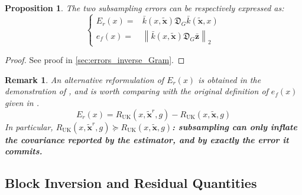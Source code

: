 \documentclass[preprint]{elsarticle}
\newtheorem{proposition}{Proposition}
\newtheorem{remark}{Remark}
\begin{document}
\begin{proposition}
    The two subsampling errors can be respectively expressed as:
    \begin{equation*}
        \left\{\begin{aligned}
        E_r(x)=&\bar{k}(x,\tilde{\mathbf{x}})\mathfrak{D}_G\bar{k}(\tilde{\mathbf{x}},x)\\
        e_f(x)=&\left\|\bar{k}(x,\tilde{\mathbf{x}})\mathfrak{D}_G\bar{\mathbf{z}}\right\|_2
        \end{aligned}\right.
    \end{equation*}\label{th:errors_inverse_Gram}
    \vspace{-\baselineskip}
\end{proposition}

\begin{proof}
    See proof in \cref{sec:errors_inverse_Gram}.
\end{proof}

\begin{remark}
    An alternative reformulation of $E_r(x)$ is obtained in the demonstration of , and is worth comparing with the original definition of $e_f(x)$ given in .
    \begin{equation*}
        E_r(x)=R_{\mathrm{UK}}(x,\tilde{\mathbf{x}}^r,g)-R_{\mathrm{UK}}(x,\tilde{\mathbf{x}},g)
    \end{equation*}
    In particular, $R_{\mathrm{UK}}(x,\tilde{\mathbf{x}}^r,g)\succeq R_{\mathrm{UK}}(x,\tilde{\mathbf{x}},g)$\textbf{: subsampling can only inflate the covariance reported by the estimator, and by exactly the error it commits.}\label{rem:variance_difference}
\end{remark}

\subsection{Block Inversion and Residual Quantities}
\end{document}
